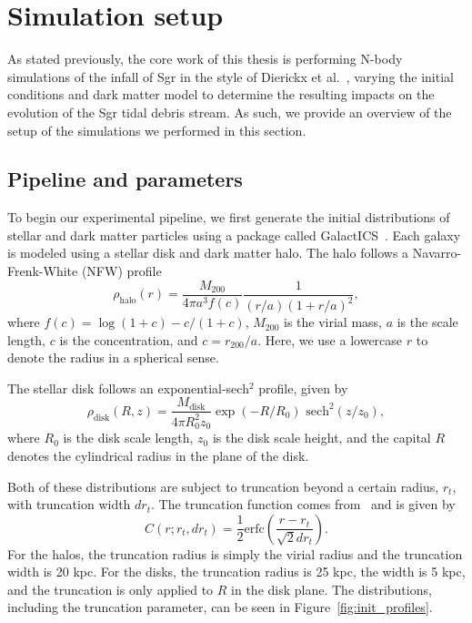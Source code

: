 \hypertarget{simulation-setup}{%
\chapter{Simulation setup}\label{simulation-setup}}

As stated previously, the core work of this thesis is performing N-body
simulations of the infall of Sgr in the style of Dierickx et
al.~\cite{dierickx_predicted_2017}, varying the initial conditions and dark
matter model to determine the resulting impacts on the evolution of the Sgr
tidal debris stream. As such, we provide an overview of the setup of the
simulations we performed in this section.

\hypertarget{pipeline-and-parameters}{%
\section{Pipeline and parameters}\label{pipeline-and-parameters}}

To begin our experimental pipeline, we first generate the initial
distributions of stellar and dark matter particles using a package called
GalactICS~\cite{deg_galactics_2019}. Each galaxy is modeled using a stellar
disk and dark matter halo. The halo follows a Navarro-Frenk-White (NFW)
profile
\begin{equation}
    \rho_{\text{halo}} (r) = 
    \frac{M_{200}}{4\pi a^3 f(c)} 
    \frac{1}{(r/a)(1+r/a)^2},
\end{equation}
where $f(c) = \log (1+c) - c/(1+c)$, $M_{200}$ is the virial mass, $a$ is the
scale length, $c$ is the concentration, and $c = r_{200} / a$. Here, we use a
lowercase $r$ to denote the radius in a spherical sense.

The stellar disk follows an exponential-sech$^2$ profile, given by
\begin{equation}
    \rho_{\text{disk}} (R, z) = 
    \frac{M_{\text{disk}}}{4 \pi R_0^2 z_0}
    \exp(-R/R_0) \text{ sech}^2(z/z_0),
\end{equation}
where $R_0$ is the disk scale length, $z_0$ is the disk scale height, and the
capital $R$ denotes the cylindrical radius in the plane of the disk.

Both of these distributions are subject to truncation beyond a certain
radius, \(r_t\), with truncation width \(dr_t\). The truncation function
comes from~\cite{widrow_dynamical_2008} and is given by
\begin{equation}
C(r; r_t, dr_t) = \frac{1}{2} \text{erfc} 
\left( \frac{r - r_t}{\sqrt{2} dr_t} \right).
\end{equation}
For the halos, the truncation radius is simply the virial radius and the
truncation width is 20 kpc. For the disks, the truncation radius is 25 kpc,
the width is 5 kpc, and the truncation is only applied to $R$ in the disk
plane. The distributions, including the truncation parameter, can be seen in
Figure~\ref{fig:init_profiles}.

